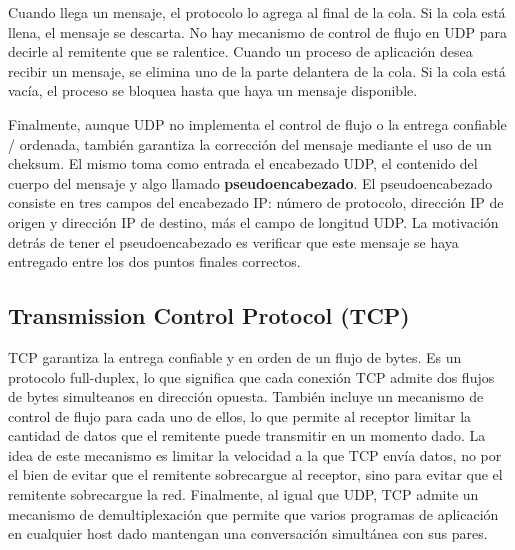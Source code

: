 Cuando llega un mensaje, el protocolo lo agrega al final de la cola. Si la cola está llena, el mensaje se descarta. No hay mecanismo de control de flujo en UDP para decirle al remitente que se ralentice. Cuando un proceso de aplicación desea recibir un mensaje, se elimina uno de la parte delantera de la cola. Si la cola está vacía, el proceso se bloquea hasta que haya un mensaje disponible.

Finalmente, aunque UDP no implementa el control de flujo o la entrega confiable / ordenada, también garantiza la corrección del mensaje mediante el uso de un cheksum. El mismo  toma como entrada el encabezado UDP, el contenido del cuerpo del mensaje y algo llamado \textbf{pseudoencabezado}. El pseudoencabezado consiste en tres campos del encabezado IP: número de protocolo, dirección IP de origen y dirección IP de destino, más el campo de longitud UDP. La motivación detrás de tener el pseudoencabezado es verificar que este mensaje se haya entregado entre los dos puntos finales correctos.

\subsection{Transmission Control Protocol (TCP)}
TCP garantiza la entrega confiable y en orden de un flujo de bytes. Es un protocolo full-duplex, lo que significa que cada conexión TCP admite dos flujos de bytes simulteanos en dirección opuesta. También incluye un mecanismo de control de flujo para cada uno de ellos, lo que permite al receptor limitar la cantidad de datos que el remitente puede transmitir en un momento dado. La idea de este mecanismo es limitar la velocidad a la que TCP envía datos, no por el bien de evitar que el remitente sobrecargue al receptor, sino para evitar que el remitente sobrecargue la red. Finalmente, al igual que UDP, TCP admite un mecanismo de demultiplexación que permite que varios programas de aplicación en cualquier host dado mantengan una conversación simultánea con sus pares. 

